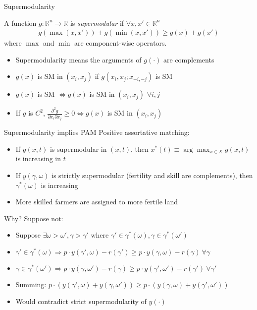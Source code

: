\documentclass[11pt,notes=hide,aspectratio=169]{beamer}
\begin{document}
\begin{frame}{Supermodularity}
\begin{definition}[Supermodularity]
A function $g:\mathbb{R}^n\to\mathbb{R}$ is \emph{supermodular} if $\forall x,x'\in\mathbb{R}^n$
\begin{align*}
g\left(\max\left(x,x'\right)\right) + g\left(\min\left(x,x'\right)\right)\geq g(x) + g(x')
\end{align*}
where $\max$ and $\min$ are component-wise operators.
\end{definition}
\begin{itemize}
	\item Supermodularity means the arguments of $g(\cdot)$ are complements
	\item $g(x)$ is SM in $(x_i,x_j)$ if $g(x_i,x_j;x_{-i,-j})$ is SM 
	\item $g(x)$ is SM $\iff g(x)$ is SM in $(x_i,x_j)$  $\forall i,j$
	\item If $g$ is $C^2$, $\frac{\partial^2 g}{\partial x_i \partial x_j}\geq 0 \iff g(x)$ is SM in $(x_i,x_j)$
\end{itemize}
\end{frame}
\begin{frame}{Supermodularity implies PAM}
Positive assortative matching:
\begin{itemize}
	\item If $g(x,t)$ is supermodular in $(x,t)$, then $x^{*}(t)\equiv \arg\max_{x\in X} g(x,t)$ is increasing in $t$
	\item If $y(\gamma,\omega)$ is strictly supermodular (fertility and skill are complements), then $\gamma^{*}(\omega)$ is increasing
	\item More skilled farmers are assigned to more fertile land
\end{itemize}
Why? Suppose not:
\begin{itemize}
	\item Suppose $\exists \omega > \omega', \gamma>\gamma'$ where $\gamma' \in \gamma^{*}(\omega), \gamma \in \gamma^{*}(\omega')$
	\item $\gamma' \in \gamma^{*}(\omega) \Rightarrow p\cdot y(\gamma',\omega) - r(\gamma') \geq p\cdot y(\gamma,\omega) - r(\gamma) \ \forall \gamma$
	\item $\gamma \in \gamma^{*}(\omega') \Rightarrow p\cdot y(\gamma,\omega') - r(\gamma) \geq p\cdot y(\gamma',\omega') - r(\gamma') \ \forall \gamma'$
	\item Summing: $p \cdot \left( y(\gamma',\omega) + y(\gamma,\omega') \right) \geq p\cdot \left(y(\gamma,\omega) + y(\gamma',\omega') \right)$
	\item Would contradict strict supermodularity of $y(\cdot)$
\end{itemize}
\end{frame}
\end{document}

